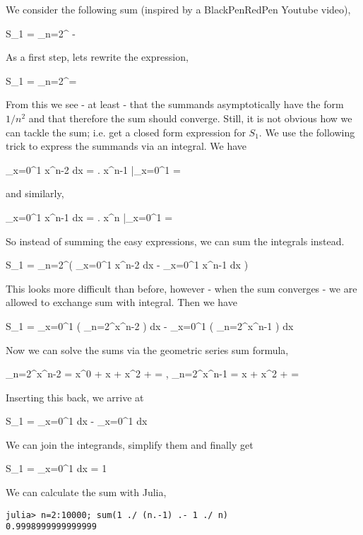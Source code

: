 
We consider the following sum (inspired by a BlackPenRedPen Youtube video),

\bee
S_1 = \sum_{n=2}^\infty {} - 
\eee

As a first step, lets rewrite the expression,

\bee
S_1 = \sum_{n=2}^\infty = 
\eee

From this we see - at least - that the summands asymptotically have the form $1/n^2$ and that therefore the sum should converge. Still, it is not obvious how we can tackle the sum; i.e. get a closed form expression for $S_1$. We use the following trick to express the summands via an integral. We have

\bee
\int_{x=0}^1 x^{n-2} dx = \left.   x^{n-1} \right|_{x=0}^1 = 
\eee

and similarly,

\bee
\int_{x=0}^1 x^{n-1} dx = \left.  x^{n} \right|_{x=0}^1 = 
\eee

So instead of summing the easy expressions, we can sum the integrals instead.

\bee
S_1 = \sum_{n=2}^\infty \left( \int_{x=0}^1 x^{n-2} dx - \int_{x=0}^1 x^{n-1} dx \right)
\eee

This looks more difficult than before, however - when the sum converges - we are allowed to exchange sum with integral. Then we have

\bee
S_1 = \int_{x=0}^1 \left( \sum_{n=2}^\infty x^{n-2} \right) dx - \int_{x=0}^1 \left( \sum_{n=2}^\infty x^{n-1} \right) dx
\eee

Now we can solve the sums via the geometric series sum formula,

\bee
\sum_{n=2}^\infty x^{n-2} = x^0 + x + x^2 + \cdots = , \quad \sum_{n=2}^\infty x^{n-1} = x + x^2 + \cdots = 
\eee

Inserting this back, we arrive at

\bee
S_1 = \int_{x=0}^1  dx - \int_{x=0}^1  dx
\eee

We can join the integrands, simplify them and finally get

\bee
S_1 = \int_{x=0}^1 dx = 1
\eee

We can calculate the sum with Julia,

\begin{verbatim}
julia> n=2:10000; sum(1 ./ (n.-1) .- 1 ./ n)
0.9998999999999999
\end{verbatim}

